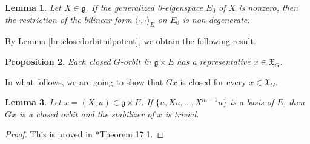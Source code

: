 \documentclass[12pt]{amsart}
\newtheorem{lm}{Lemma}[section]
\newtheorem{prop}[lm]{Proposition}
\theoremstyle{definition}
\theoremstyle{remark}\newtheorem{rmk}[lm]{Remark}
\newcommand{\rs}{\mathrm{s}}
\newcommand{\g}{\mathfrak g}
\newcommand{\fX}{\mathfrak X}
\newcommand{\C}{\mathbb{F}}
\begin{document}
	\begin{lm}
		\label{lm:0eigenspace}
		Let $X\in\g$. If the generalized 0-eigenspace $E_0$ of $X$ is nonzero, then the restriction of the bilinear form $\langle\cdot,\cdot\rangle_E$ on $E_0$ is non-degenerate. 
	\end{lm}
		
By Lemma \ref{lm:closedorbitnilpotent}, we obtain the following result.

	\begin{prop}
		\label{prop:closedorbitnilpotent}
		Each closed $G$-orbit in $\g\times E$ has a representative $x\in\fX_G$.
	\end{prop}
    In what follows, we are going to show that   $Gx$ is  closed  for every $x\in\fX_{G}$.
    
    \begin{lm}
    	\label{lm:closedmaximal}
    	Let $x=(X,u)\in\g\times E$. If $\{u,Xu,\dots,X^{m-1}u\}$ is a basis of $E$, then $Gx$ is a closed orbit and the stabilizer of $x$ is trivial.
    \end{lm}
    \begin{proof}
    	This is proved in \cite{RS}*{Theorem 17.1}.
    \end{proof}
    
\end{document}

